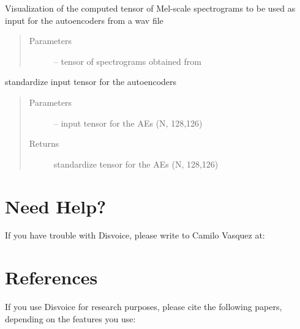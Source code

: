 \documentclass[letterpaper,10pt,english]{sphinxmanual}
\begin{document}
\begin{fulllineitems}
\begin{fulllineitems}
\label{\detokenize{RepLearning:AEspeech.AEspeech.show_spectrograms}}
Visualization of the computed tensor of Mel-scale spectrograms to be used as input for the autoencoders from a wav file
\begin{quote}\begin{description}
\item[{Parameters}] \leavevmode
{} -- tensor of spectrograms obtained from 

\end{description}\end{quote}

\end{fulllineitems}


\begin{fulllineitems}
\label{\detokenize{RepLearning:AEspeech.AEspeech.standard}}
standardize input tensor for the autoencoders
\begin{quote}\begin{description}
\item[{Parameters}] \leavevmode
{} -- input tensor for the AEs (N, 128,126)

\item[{Returns}] \leavevmode
standardize tensor for the AEs (N, 128,126)

\end{description}\end{quote}

\end{fulllineitems}


\end{fulllineitems}



\chapter{Need Help?}
\label{\detokenize{help::doc}}\label{\detokenize{help:need-help}}
If you have trouble with Disvoice, please write to Camilo Vasquez at: 


\chapter{References}
\label{\detokenize{reference::doc}}\label{\detokenize{reference:references}}
If you use Disvoice for research purposes, please cite the following papers, depending on the features you use:
\end{document}
